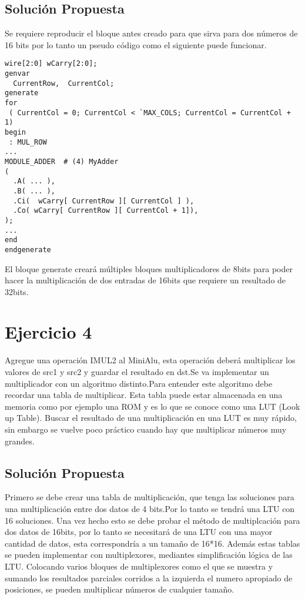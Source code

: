\documentclass[10pt]{article}
\begin{document}
\subsection*{Solución Propuesta}

Se requiere reproducir el bloque antes creado para que sirva para dos números de 16 bits por lo tanto un pseudo código como el
siguiente puede funcionar. 

\begin{lstlisting}
wire[2:0] wCarry[2:0];
genvar
  CurrentRow,  CurrentCol;
generate
for
 ( CurrentCol = 0; CurrentCol < `MAX_COLS; CurrentCol = CurrentCol + 1)
begin
 : MUL_ROW
...
MODULE_ADDER  # (4) MyAdder
(
  .A( ... ),
  .B( ... ),
  .Ci(  wCarry[ CurrentRow ][ CurrentCol ] ),
  .Co( wCarry[ CurrentRow ][ CurrentCol + 1]),
);
...
end
endgenerate
\end{lstlisting}

El bloque generate creará múltiples bloques multiplicadores de 8bits para poder hacer la multiplicación de dos entradas de 16bits que requiere un resultado de 32bits.
\newpage

\section*{Ejercicio 4}
Agregue una operación IMUL2 al MiniAlu, esta operación deberá multiplicar los valores de src1 y src2 y guardar el resultado en dst.Se va implementar un multiplicador con un algoritmo distinto.Para entender este algoritmo debe recordar una tabla de multiplicar.
Esta tabla puede estar almacenada en una memoria como por ejemplo una ROM y es lo que se conoce como una LUT (Look up Table).
Buscar el resultado de una multiplicación en una LUT es muy rápido, sin embargo se vuelve poco práctico cuando hay que multiplicar números muy grandes.

\subsection*{Solución Propuesta}

Primero se debe crear una tabla de multiplicación, que tenga las soluciones para una multiplicación entre dos datos de 4 bits.Por lo tanto se tendrá una LTU con 16 soluciones. 
Una vez hecho esto se debe probar el método de multiplcación para dos datos de 16bits, por lo tanto se necesitará de una LTU con una mayor cantidad de datos, esta correspondría a un tamaño de 16*16.
Además estas tablas se pueden implementar con multiplexores, mediantes simplificación lógica de las LTU. Colocando varios bloques de multiplexores como el que se muestra y sumando los resultados parciales corridos a la izquierda el numero apropiado de posiciones, se pueden
multiplicar números de cualquier tamaño.
\end{document}
